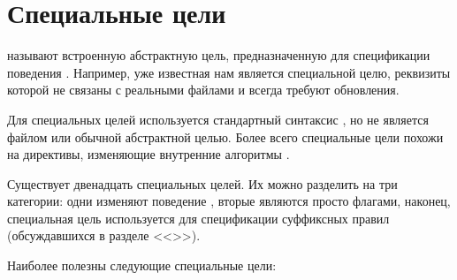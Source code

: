 \section{Специальные цели}

 называют встроенную абстрактную цель,
предназначенную для спецификации поведения \GNUmake{}. Например, уже
известная нам  является специальной целю, реквизиты
которой не связаны с реальными файлами и всегда требуют обновления.

Для специальных целей используется стандартный синтаксис
, но  не является файлом
или обычной абстрактной целью. Более всего специальные цели похожи на
директивы, изменяющие внутренние алгоритмы \GNUmake{}.

Существует двенадцать специальных целей. Их можно разделить на три
категории: одни изменяют поведение \GNUmake{}, вторые являются просто
флагами, наконец, специальная цель  используется
для спецификации суффиксных правил (обсуждавшихся в разделе
<<>>).

Наиболее полезны следующие специальные цели:

